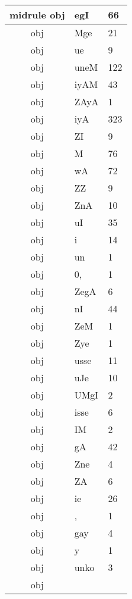 \documentclass[a4 paper]{article}
\begin{document}
\begin{longtable}{cp{}p{}}
midrule obj & egI & 66\\ \midrule obj & Mge & 21\\ \midrule obj & ue & 9\\ \midrule obj & uneM & 122\\ \midrule obj & iyAM & 43\\ \midrule obj & ZAyA & 1\\ \midrule obj & iyA & 323\\ \midrule obj & ZI & 9\\ \midrule obj & M & 76\\ \midrule obj & wA & 72\\ \midrule obj & ZZ & 9\\ \midrule obj & ZnA & 10\\ \midrule obj & uI & 35\\ \midrule obj & i & 14\\ \midrule obj & un & 1\\ \midrule obj & 0, & 1\\ \midrule obj & ZegA & 6\\ \midrule obj & nI & 44\\ \midrule obj & ZeM & 1\\ \midrule obj & Zye & 1\\ \midrule obj & usse & 11\\ \midrule obj & uJe & 10\\ \midrule obj & UMgI & 2\\ \midrule obj & isse & 6\\ \midrule obj & IM & 2\\ \midrule obj & gA & 42\\ \midrule obj & Zne & 4\\ \midrule obj & ZA & 6\\ \midrule obj & ie & 26\\ \midrule obj & , & 1\\ \midrule obj & gay & 4\\ \midrule obj & y & 1\\ \midrule obj & unko & 3\\ \midrule obj
\end{longtable}
\end{document}
